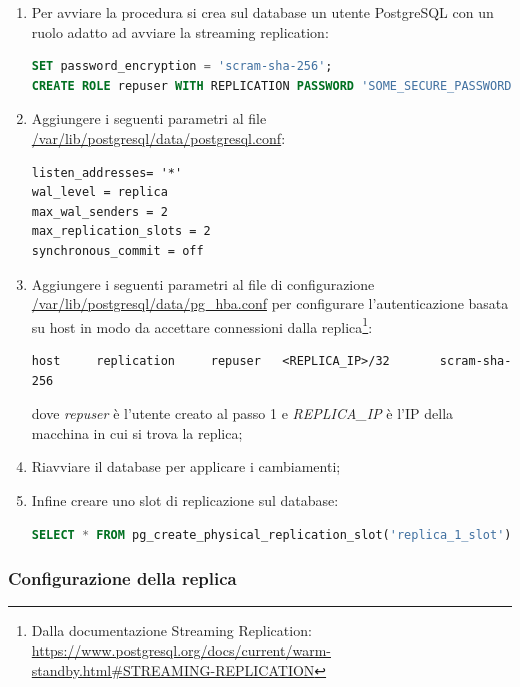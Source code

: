 \begin{enumerate}
  \item Per avviare la procedura si crea sul database un utente PostgreSQL con un ruolo adatto ad avviare la streaming replication:
  \vspace{1mm}
   \begin{lstlisting}[language=sql]
SET password_encryption = 'scram-sha-256'; 
CREATE ROLE repuser WITH REPLICATION PASSWORD 'SOME_SECURE_PASSWORD' LOGIN;\end{lstlisting}
  \item Aggiungere i seguenti parametri al file \url{/var/lib/postgresql/data/postgresql.conf}:
  \vspace{1mm}
  \begin{lstlisting}[]
listen_addresses= '*'
wal_level = replica
max_wal_senders = 2
max_replication_slots = 2
synchronous_commit = off
\end{lstlisting}

  \item Aggiungere i seguenti parametri al file di configurazione \url{/var/lib/postgresql/data/pg_hba.conf} per configurare l'autenticazione basata su host in modo da accettare connessioni dalla replica\footnote{Dalla documentazione Streaming Replication: \url{https://www.postgresql.org/docs/current/warm-standby.html\#STREAMING-REPLICATION}}:
  \vspace{1mm}
\begin{lstlisting}[]
host     replication     repuser   <REPLICA_IP>/32       scram-sha-256
\end{lstlisting}
dove \textit{repuser} è l'utente creato al passo 1 e \textit{REPLICA\_IP} è l'IP della macchina in cui si trova la replica;
  \item Riavviare il database per applicare i cambiamenti;
  \item Infine creare uno slot di replicazione sul database:
  \vspace{1mm}
  \begin{lstlisting}[language=sql]
SELECT * FROM pg_create_physical_replication_slot('replica_1_slot');
\end{lstlisting}
\end{enumerate}

\subsubsection{Configurazione della replica}

